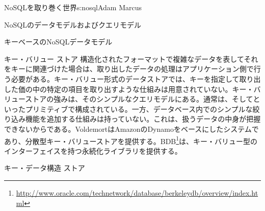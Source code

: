 \begin{aosachapter}{NoSQLを取り巻く世界}{s:nosql}{Adam Marcus}
\begin{aosasect1}{NoSQLのデータモデルおよびクエリモデル}
\begin{aosasect2}{キーベースのNoSQLデータモデル}
\begin{aosasect3}{キー・バリュー ストア}
構造化されたフォーマットで複雑なデータを表してそれをキーに関連づけた場合は、取り出したデータの処理はアプリケーション側で行う必要がある。キー・バリュー形式のデータストアでは、キーを指定して取り出した価の中の特定の項目を取り出すような仕組みは用意されていない。キー・バリューストアの強みは、そのシンプルなクエリモデルにある。通常は、そしてといったプリミティブで構成されている。一方、データベース内でのシンプルな絞り込み機能を追加する仕組みは持っていない。これは、扱うデータの中身が把握できないからである。VoldemortはAmazonのDynamoをベースにしたシステムであり、分散型キー・バリューストアを提供する。BDB\footnote{\url{http://www.oracle.com/technetwork/database/berkeleydb/overview/index.html}}は、キー・バリュー型のインターフェイスを持つ永続化ライブラリを提供する。

\end{aosasect3}

\begin{aosasect3}{キー・データ構造 ストア}


\end{aosasect3}
\end{aosasect2}
\end{aosasect1}
\end{aosachapter}
